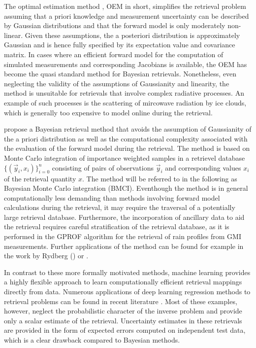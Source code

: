 \documentclass[journal abbreviation, manuscript]{copernicus}
\begin{document}
The optimal estimation method \citep{rodgers}, OEM in short,
simplifies the retrieval problem assuming that a priori knowledge and
measurement uncertainty can be described by Gaussian distributions and that the
forward model is only moderately non-linear. Given these assumptions, the a
posteriori distribution is approximately Gaussian and is hence fully specified
by its expectation value and covariance matrix. In cases where an efficient
forward model for the computation of simulated measurements and corresponding
Jacobians is available, the OEM has become the quasi standard method for Bayesian
retrievals. Nonetheless, even neglecting the validity of the assumptions of
Gaussianity and linearity, the method is unsuitable for retrievals that involve
complex radiative processes. An example of such processes is the scattering
of mircowave radiation by ice clouds, which is generally too expensive to model
online during the retrieval.

\cite{kummerow_1} propose a Bayesian retrieval method that avoids the assumption
of Gaussianity of the a priori distribution as well as the computational
complexity associated with the evaluation of the forward model during the
retrieval. The method is based on Monte Carlo integration of importance weighted
samples in a retrievel database $\{(\vec{y}_i, x_i)\}_{i = 0}^n$ consisting of
pairs of observations $\vec{y}_i$ and corresponding values $x_i$ of the
retrieval quantity $x$. The method will be referred to in the following as
Bayesian Monte Carlo integration (BMCI). Eventhough the method is in general
computationally less demanding than methods involving forward model calculations
during the retrieval, it may require the traversal of a potentially large
retrieval database. Furthermore, the incorporation of ancillary data to aid the
retrieval requires careful stratification of the retrieval database, as it is
performed in the GPROF \citep{gprof} algorithm for the retrieval of rain
profiles from GMI measurements. Further applications of the method can be
found for example in the work by Rydberg (\citeyear{rydberg_2, rydberg_1})
or \cite{evans_2}.

In contrast to these more formally motivated methods, machine learning provides a
highly flexible approach to learn computationally efficient retrieval mappings
directly from data. Numerous applications of deep learning regression methods
to retrieval problems can be found in recent literature \citep{holl, strandgren, hakansson}.
Most of these examples, however, neglect the probabilistic character of the inverse problem
and provide only a scalar estimate of the retrieval. Uncertainty estimates in these
retrievals are provided in the form of expected errors computed on independent test data,
which is a clear drawback compared to Bayesian methods.
\end{document}
